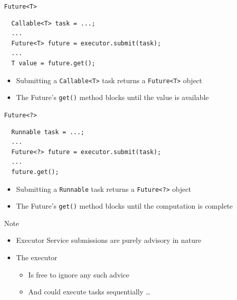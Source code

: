 \begin{frame}[fragile]{\lstinline!Future<T>!}
\begin{lstlisting}
  Callable<T> task = ...; 
  ...
  Future<T> future = executor.submit(task);
  ...
  T value = future.get(); 
\end{lstlisting}


  \begin{itemize}
  \item Submitting a \lstinline!Callable<T>! task returns a
    \lstinline!Future<T>! object
  \item The Future's \lstinline!get()! method blocks until the value
    is available
  \end{itemize}
\end{frame}

\begin{frame}[fragile]{\lstinline!Future<?>!}
\begin{lstlisting}
  Runnable task = ...; 
  ...
  Future<?> future = executor.submit(task);
  ...
  future.get(); 
\end{lstlisting}


  \begin{itemize}
  \item Submitting a \lstinline!Runnable! task returns a
    \lstinline!Future<?>! object
  \item The Future's \lstinline!get()! method blocks until the
    computation is complete
  \end{itemize}
\end{frame}

\begin{frame}{Note}
  \begin{itemize}
  \item Executor Service submissions are purely advisory in nature
  \item The executor
    \begin{itemize}
    \item Is free to ignore any such advice
    \item And could execute tasks sequentially \ldots
    \end{itemize}
  \end{itemize}
\end{frame}

